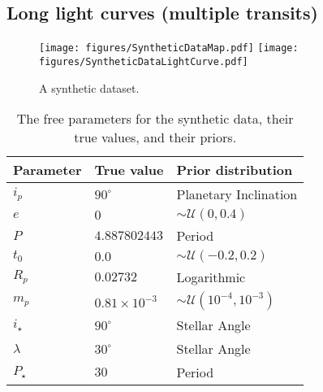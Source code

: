 \documentclass[twocolumn]{aastex631}
\begin{document}
\subsection{Long light curves (multiple transits)}

\begin{figure}[ht!]
    \begin{centering}
        \texttt{[image: figures/SyntheticDataMap.pdf]}
        \texttt{[image: figures/SyntheticDataLightCurve.pdf]}
        \caption{
            A synthetic dataset.
        }
        \label{fig:SyntheticData}
    \end{centering}
\end{figure}

\begin{table}[]
    \label{tab:LongPriors}
    \caption{The free parameters for the synthetic data, their true values, and their priors.}
    \begin{tabular}{lll}
    \hline
    Parameter                                 & True value            & Prior distribution                      \\ \hline\hline
    $i_p$                                     & $90^\circ$            & Planetary Inclination                   \\
    $e$                                       & $0$                   & $\sim\mathcal{U}(0, 0.4)$               \\
    $P$                                       & $4.887802443$         & Period                                  \\
    $t_0$                                     & $0.0$                 & $\sim\mathcal{U}(-0.2, 0.2)$            \\
    $R_p$                                     & $0.02732$             & Logarithmic                             \\
    $m_p$                                     & $0.81 \times 10^{-3}$ & $\sim\mathcal{U}(10^{-4}, 10^{-3})$     \\ \hline
    $i_\star$                                 & $90^\circ$            & Stellar Angle                           \\
    $\lambda$                                 & $30^\circ$            & Stellar Angle                           \\
    $P_\star$                                 & $30$                  & Period                                  \\ \hline

\end{tabular}
\end{table}
\end{document}

